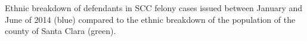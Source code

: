 Ethnic breakdown of defendants in SCC felony cases issued between January and June of 2014 (blue) compared to the ethnic breakdown of the population of the county of Santa Clara (green).
\label{fig:EthnicBreakdown}